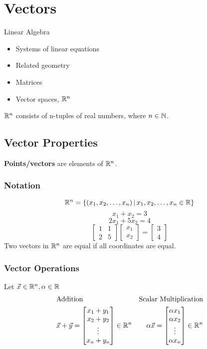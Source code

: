 \documentclass[english, 12pt]{article}
\begin{document}
\notesheader
\section{Vectors}
Linear Algebra 
\begin{itemize}
\item Systems of linear equations
\item Related geometry
\item Matrices
\item Vector spaces, ${\mathbb{R}}^n$
\end{itemize}
${\mathbb{R}}^n$ consists of n-tuples of real numbers, where $n \in {\mathbb{N}}$. 
\subsection{Vector Properties}
\begin{defn}
\textbf{Points/vectors} are elements of ${\mathbb{R}}^n$.
\end{defn}
\subsubsection*{Notation}
\[{\mathbb{R}}^n = \{(x_{1},x_{2},\dots,x_{n})\,|\, x_{1},x_{2},\dots,x_{n} \in {\mathbb{R}} \}\]
\[x_{1} + x_{2} = 3\]
\[2 x_{1} + 5 x_{2} = 4\]
\[
\begin{bmatrix}
1 & 1\\
2 & 5
\end{bmatrix}
\begin{bmatrix}
x_{1}\\
x_{2}
\end{bmatrix}
=
\begin{bmatrix}
3\\
4
\end{bmatrix}
\]
Two vectors in ${\mathbb{R}}^n$ are equal if all coordinates are equal.
\subsubsection*{Vector Operations}
Let $\vec{x} \in {\mathbb{R}}^n, \alpha \in {\mathbb{R}}$
\begin{align*}
& \text{Addition} & \text{Scalar Multiplication} \\
& \vec{x} + \vec{y} = 
\begin{bmatrix}
x_{1} + y_{1} \\
x_{2} + y_{2} \\
\vdots \\
x_{n} + y_{n}
\end{bmatrix} \in {\mathbb{R}}^n & 
\alpha \vec{x} = 
\begin{bmatrix}
\alpha x_{1} \\
\alpha x_{2} \\
\vdots \\
\alpha x_{n} 
\end{bmatrix} \in {\mathbb{R}}^n
\end{align*}
\end{document}

